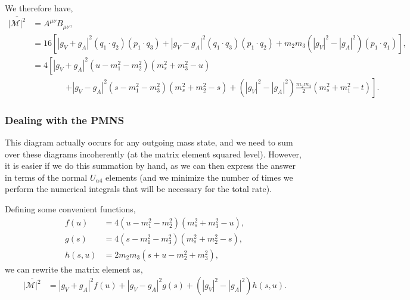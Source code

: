 \documentclass[11pt, a4paper]{article}
\begin{document}
%
We therefore have, 
%
\begin{align*} \overline{\left|\mathcal{M}\right|^2} &= A^{\mu\nu}B_{\mu\nu},\\  
%
&= 16\left[ \left|g_V+g_A\right|^2\left(q_1\cdot q_2\right) \left(p_1\cdot
q_3\right) + \left|g_V-g_A\right|^2\left(q_1\cdot q_3\right) \left(p_1\cdot
q_2\right) + m_2m_3\left(|g_V|^2-|g_A|^2\right)\left(p_1\cdot q_1\right)  \right],\\
%
&=4\left[ \left|g_V+g_A\right|^2 (u - m_1^2 - m_2^2)(m_s^2 + m_3^2 - u)\right.\\
%
&\qquad\qquad \left.+ \left|g_V-g_A\right|^2 (s -m_1^2 - m_3^2)(m_s^2 + m_2^2 - s) + \left(|g_V|^2-|g_A|^2\right)\frac{m_2m_3}{2}\left( m_s^2+m_1^2 - t\right) \right].
%
\end{align*}
%

\subsubsection{Dealing with the PMNS}

This diagram actually occurs for any outgoing mass state, and we need to sum
over these diagrams incoherently (at the matrix element squared level).
However, it is easier if we do this summation by hand, as we can then express
the answer in terms of the normal $U_{\alpha 4}$ elements (and we minimize the 
number of times we perform the numerical integrals that will be necessary for
the total rate).

%
Defining some convenient functions, 
%
\begin{align*}  f(u) &= 4(u - m_1^2 - m_2^2)(m_s^2 + m_3^2 - u),\\  
g(s) &= 4(s -m_1^2 - m_3^2)(m_s^2 + m_2^2 - s),\\
h(s,u) &= 2m_2m_3\left(s + u - m_2^2 + m_3^2\right), \end{align*}
%
we can rewrite the matrix element as,
%
\begin{align*} \overline{\left|\mathcal{M}\right|^2} &=\left|g_V+g_A\right|^2 f(u)
+ \left|g_V-g_A\right|^2g(s) + \left(|g_V|^2-|g_A|^2\right)h(s,u).
%
\end{align*}
%
\end{document}
